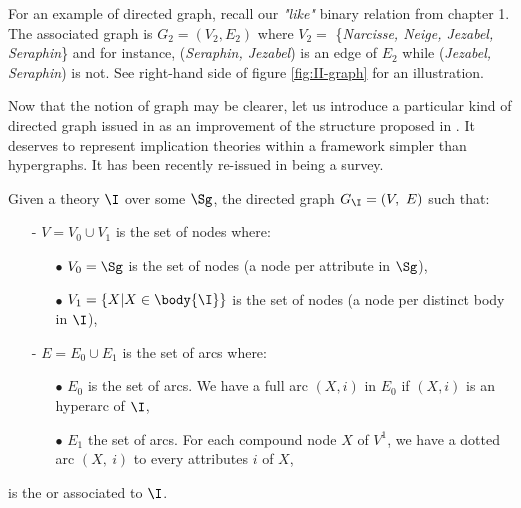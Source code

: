 For an example of directed graph, recall our \textit{"like"} binary relation from chapter 1. The associated graph is $G_2 = (V_2, E_2)$ where $V_2 = $ 
\{\textit{Narcisse, Neige, Jezabel, Seraphin}\} and for instance, 
(\textit{Seraphin, Jezabel}) is an edge of $E_2$ while (\textit{Jezabel, 
Seraphin}) is not. See right-hand side of figure \ref{fig:II-graph} for an 
illustration.

\vspace{1.2em}

Now that the notion of graph may be clearer, let us introduce a particular
kind of directed graph issued in \cite{ausiello_graph_1983, 
ausiello_minimal_1986} as an improvement of the structure proposed in 
\cite{ausiello_graph_1980}. It deserves to represent implication theories within
a framework simpler than hypergraphs. It has been recently re-issued in 
\cite{ausiello_directed_2017} being a survey.

\begin{definition} Given a theory $\I$ over some $\Sg$, 
the directed graph $G_{\I} = (V, \  E)$ such that:
\begin{itemize}
	\item[-] $V = V_0 \cup V_1$ is the set of nodes where:
	\begin{itemize}
		\item[$\bullet$] $V_0 = \Sg$ is the set of  nodes (a node
		per attribute in $\Sg$),
		\item[$\bullet$] $V_1 = \{X | X \in \body{\I} \}$ is the set of 
		 nodes (a node per distinct body in $\I$),
	\end{itemize}
	
	\item[-] $E = E_0 \cup E_1$ is the set of arcs where:
	\begin{itemize}
		\item[$\bullet$] $E_0$ is the set of  arcs. We have a full arc $(X, i)$ in	$E_0$ if $(X, i)$ is an hyperarc of $\I$,
		\item[$\bullet$] $E_1$ the set of  arcs. For each compound node $X$ of $V^1$, we have a dotted arc $(X, \ i)$ to every attributes $i$ of $X$,
	\end{itemize}
	
\end{itemize}
\noindent is the  or  
associated to $\I$.
\end{definition}


